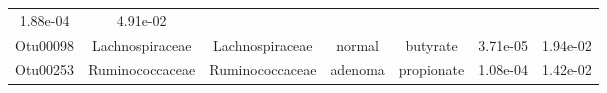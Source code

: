 \documentclass[11pt,]{article}
\begin{document}
\begin{longtable}[]{@{}ccccccc@{}}
\begin{minipage}[t]{0.09\columnwidth}
1.88e-04\strut
\end{minipage} & \begin{minipage}[t]{0.09\columnwidth}\centering\strut
4.91e-02\strut
\end{minipage}\tabularnewline
\begin{minipage}[t]{0.09\columnwidth}\centering\strut
Otu00098\strut
\end{minipage} & \begin{minipage}[t]{0.17\columnwidth}\centering\strut
Lachnospiraceae\strut
\end{minipage} & \begin{minipage}[t]{0.17\columnwidth}\centering\strut
Lachnospiraceae\strut
\end{minipage} & \begin{minipage}[t]{0.09\columnwidth}\centering\strut
normal\strut
\end{minipage} & \begin{minipage}[t]{0.11\columnwidth}\centering\strut
butyrate\strut
\end{minipage} & \begin{minipage}[t]{0.09\columnwidth}\centering\strut
3.71e-05\strut
\end{minipage} & \begin{minipage}[t]{0.09\columnwidth}\centering\strut
1.94e-02\strut
\end{minipage}\tabularnewline
\begin{minipage}[t]{0.09\columnwidth}\centering\strut
Otu00253\strut
\end{minipage} & \begin{minipage}[t]{0.17\columnwidth}\centering\strut
Ruminococcaceae\strut
\end{minipage} & \begin{minipage}[t]{0.17\columnwidth}\centering\strut
Ruminococcaceae\strut
\end{minipage} & \begin{minipage}[t]{0.09\columnwidth}\centering\strut
adenoma\strut
\end{minipage} & \begin{minipage}[t]{0.11\columnwidth}\centering\strut
propionate\strut
\end{minipage} & \begin{minipage}[t]{0.09\columnwidth}\centering\strut
1.08e-04\strut
\end{minipage} & \begin{minipage}[t]{0.09\columnwidth}\centering\strut
1.42e-02\strut
\end{minipage}\tabularnewline

\end{longtable}
\end{document}
